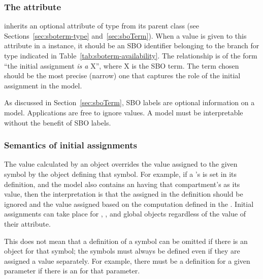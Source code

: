 \subsubsection{The  attribute}
\label{sec:initialassignment-sboterm}

\InitialAssignment inherits an optional 
attribute of type  from its parent
class \SBase (see Sections~\ref{sec:sboterm-type}
and~\ref{sec:sboTerm}).  When a value is given to this
attribute in a \InitialAssignment instance, it should be an
SBO identifier belonging to the branch for type \InitialAssignment  
indicated in Table~\ref{tab:sboterm-availability}.  The relationship is
of the form ``the initial assignment \emph{is a} X'', where X is
the SBO term.  The term chosen should be the most precise (narrow)
one that captures the role of the initial assignment in the model.

As discussed in Section~\ref{sec:sboTerm}, SBO labels are optional
information on a model.  Applications are free to ignore
 values.  A model must be interpretable without the
benefit of SBO labels.


\subsubsection{Semantics of initial assignments}
\label{sec:initial-assignment-semantics}

The value calculated by an \InitialAssignment object overrides the
value assigned to the given symbol by the object defining that
symbol.  For example, if a \Compartment's  is set in
its definition, and the model also contains an \InitialAssignment
having that compartment's  as its  value,
then the interpretation is that the  assigned in the
\Compartment definition should be ignored and the value assigned
based on the computation defined in the \InitialAssignment.
Initial assignments can take place for \Compartment, \Species, 
\SpeciesReference and global \Parameter objects regardless of the 
value of their  attribute.

This does not mean that a definition of a symbol can be omitted if
there is an \InitialAssignment object for that symbol; the symbols
must always be defined even if they are assigned a value
separately.  For example, there must be a \Parameter definition
for a given parameter if there is an \InitialAssignment for that
parameter.

